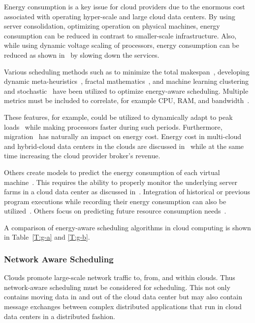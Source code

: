 \documentclass[final,5p,times,twocolumn]{elsarticle}
\begin{document}
Energy consumption is a key issue for cloud providers due to the enormous cost associated with operating hyper-scale and large cloud data centers. By using server consolidation, optimizing operation on physical machines, energy consumption can be reduced in contrast to smaller-scale infrastructure. Also, while using dynamic voltage scaling of processors, energy consumption can be reduced as shown in~\cite{las09dvfs,las10dvfs,calheiros2014energy} by slowing down the services.

Various scheduling methods such as to minimize the total makespan~\cite{bessis2013using}, developing dynamic meta-heuristics~\cite{bi2017application}, fractal mathematics~\cite{duan2016energy}, and machine learning clustering and stochastic~\cite{bui2017energy} have been utilized to optimize energy-aware scheduling. Multiple metrics must be included to correlate, for example CPU, RAM, and bandwidth~\cite{zhu2017three}.

These features, for example, could be utilized to dynamically adapt to peak loads~\cite{duan2016energy} while making processors faster during such periods. Furthermore, migration~\cite{beloglazov2010energy} has naturally an impact on energy cost. Energy cost in multi-cloud and hybrid-cloud data centers in the clouds are discussed in~\cite{quarati2013hybrid,garg2011environment,gai2016dynamic,dabbagh2015energy} while at the same time increasing the cloud provider broker’s revenue.


Others create models to predict the energy consumption of each virtual machine~\cite{kim2014energy}. This requires the ability to properly monitor the underlying server farms in a cloud data center as discussed in~\cite{van2012comparison}. Integration of historical or previous program executions while recording their energy consumption can also be utilized~\cite{hu2010scheduling}. Others focus on predicting future resource consumption needs~\cite{dabbagh2015energy}.

A comparison of energy-aware scheduling algorithms in cloud computing is shown in Table~\ref{T:g-a} and \ref{T:g-b}.



%

\subsubsection{Network Aware Scheduling}\label{sec:network}

Clouds promote large-scale network traffic to, from, and within clouds. Thus network-aware scheduling must be considered for scheduling. This not only contains moving data in and out of the cloud data center but may also contain message exchanges between complex distributed applications that run in cloud data centers in a distributed fashion.
\end{document}
